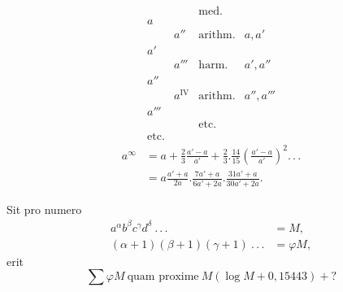 \[
\renewcommand{\arraystretch}{1.05}
\begin{array}{l|ll|l}
&&\text{med.}&\\
a&&&\\
&a''&\text{arithm.}&a,a'\\
a'&&&\\
&a'''&\text{harm.}&a',a''\\
a''&&&\\
&a^{\mathrm{IV}}&\text{arithm.}&a'',a'''\\
a'''&&&\\
&&\text{etc.}&\\
\text{etc.}&&&
\end{array}
\]
\[
\begin{aligned}
a^\infty&=a+\frac23\frac{a'-a}{a'}+\frac23.\frac{14}{15}\left(\frac{a'-a}{a'}\right)^2.\,.\,.\\
&=a\frac{a'+a}{2a}.\frac{7a'+a}{6a'+2a}.\frac{31a'+a}{30a'+2a}.
\end{aligned}
\]
\ClosingRule
{}
\par\indent Sit pro numero
\[
\begin{aligned}
a^\alpha b^\beta c^\gamma d^\delta\ .\,.\,.&=M,\\
(\alpha+1)(\beta+1)(\gamma+1)\ .\,.\,.&=\varphi M,
\end{aligned}
\]
\noindent erit
\[
\sum\varphi M\ \text{quam proxime}\ M(\log M+0,15443)+?
\]
\clearpage
